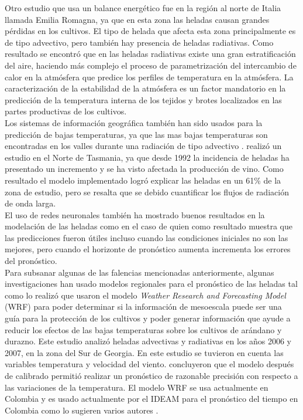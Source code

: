 \documentclass[11pt]{article}
\begin{document}
Otro estudio que usa un balance energético fue \citep{Rossi2002} en la región al norte de Italia llamada Emilia Romagna, ya que en esta zona las heladas causan grandes pérdidas en los cultivos. El tipo de helada que afecta esta zona principalmente es de tipo advectivo, pero también hay presencia de heladas radiativas. Como resultado se encontró que en las heladas radiativas existe una gran estratificación del aire, haciendo más complejo el proceso de parametrización del intercambio de calor en la atmósfera que predice los perfiles de temperatura en la atmósfera. La caracterización de la estabilidad de la atmósfera es un factor mandatorio en la predicción de la temperatura interna de los tejidos y brotes localizados en las partes productivas de los cultivos.\\

Los sistemas de información geográfica también han sido usados para la predicción de bajas temperaturas, ya que las mas bajas temperaturas son encontradas en los valles durante una radiación de tipo advectivo \citep{Halley2003, Blennow1998}. \citet{Halley2003} realizó un estudio en el Norte de Tasmania, ya que desde 1992 la incidencia de heladas ha presentado un incremento y se ha visto afectada la producción de vino. Como resultado el modelo implementado logró explicar las heladas en un 61\% de la zona de estudio, pero se resalta que se debido cuantificar los flujos de radiación de onda larga.\\

El uso de redes neuronales también ha mostrado buenos resultados en la modelación de las heladas como en el caso de \citep{Smith2007} quien como resultado muestra que las predicciones fueron útiles incluso cuando las condiciones iniciales no son las mejores, pero cuando el horizonte de pronóstico aumenta incrementa los errores del pronóstico.\\

Para subsanar algunas de las falencias mencionadas anteriormente, algunas investigaciones han usado modelos regionales para el pronóstico de las heladas tal como lo realizó \citet{prabha2008evaluation} que usaron el modelo \textit{Weather Research and Forecasting Model} (WRF) para poder determinar  si la información de mesoescala puede ser una guía para la protección de los cultivos y poder generar información que ayude a reducir los efectos de las bajas temperaturas sobre los cultivos de arándano y durazno. Este estudio analizó heladas advectivas y radiativas en los años 2006 y 2007, en la zona del Sur de Georgia. En este estudio se tuvieron en cuenta las variables temperatura y velocidad del viento. \citet{prabha2008evaluation} concluyeron que el modelo después de calibrado permitió realizar un pronóstico de razonable precisión con respecto a las variaciones de la temperatura. El modelo WRF se usa actualmente en Colombia y es usado actualmente por el IDEAM para el pronóstico del tiempo en Colombia como lo sugieren varios autores \citep{Arango2011, Mejia2012, Ruiz2014}.\\
\end{document}
